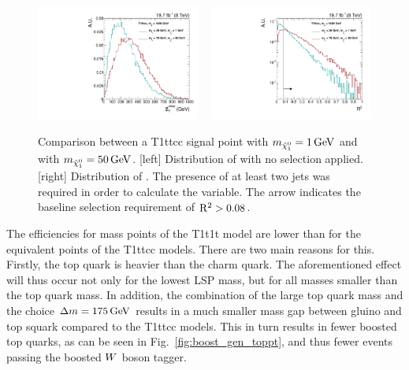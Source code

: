 \begin{figure}[htbp]
 \centering
\includegraphics[width=0.48\textwidth]{figures/razor_interpretation/Eff_drop_met}
~
\includegraphics[width=0.48\textwidth]{figures/razor_interpretation/Eff_drop_rsq}
\caption{Comparison between a T1ttcc signal point with $m_{\tilde{\chi}_1^0} = 1\,\text{Ge\hspace{-.08em}V}$ and with $m_{\tilde{\chi}_1^0} =
50\,\text{Ge\hspace{-.08em}V}$. [left] Distribution of \ETm with no selection applied.
[right] Distribution of \rsq. The presence of at least two jets was required in order to calculate
the \rsq variable. The arrow indicates the baseline selection requirement of $\mathrm{R^2} > 0.08$.
 \label{fig:boost_eff_drop_met_rsq}}
\end{figure}

The efficiencies for mass points of the T1t1t model are lower than for the equivalent points of the
T1ttcc models. There are two main reasons for this.
Firstly, the top quark is heavier than the charm quark. The aforementioned effect will thus occur
not only for the lowest LSP mass, but for all masses smaller than the top quark mass. 
In addition, the combination of the large top quark mass and the choice $\Delta m = 175\,\text{Ge\hspace{-.08em}V}$
results in a much smaller mass gap between gluino and top squark compared to the T1ttcc models.
This in turn results in fewer boosted top quarks, as can be seen in Fig.~\ref{fig:boost_gen_toppt},
and thus fewer events passing the boosted $W$ boson tagger. 



